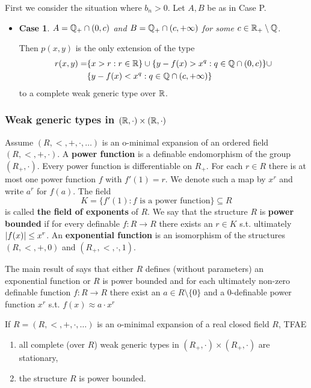 \documentclass[11pt]{article}
\begin{document}
\begin{itemize}
First we consider the situation where \(b_n>0\). Let \(A,B\) be as in Case P.
\begin{itemize}
\item \textbf{Case 1}. \emph{\(A=\mathbb{Q}_+\cap(0,c)\) and \(B=\mathbb{Q}_+\cap(c,+\infty)\) for some \(c\in\mathbb{R}_+\setminus\mathbb{Q}\).}

Then \(p(x,y)\) is the only extension of the type
\begin{align*}
r(x,y)=&\{x>r:r\in\mathbb{R}\}\cup\{y-f(x)>x^q:q\in\mathbb{Q}\cap(0,c)\}\cup\\
&\{y-f(x)<x^q:q\in\mathbb{Q}\cap(c,+\infty)\}
\end{align*}
to a complete weak generic type over \(\mathbb{R}\).
\end{itemize}
\end{itemize}

\subsubsection{Weak generic types in \texorpdfstring{\((\mathbb{R},\cdot)\times(\mathbb{R},\cdot)\)}{R^2}}
\label{sec:orga31ba1e}
Assume \((R,<,+,\cdot,\dots)\) is an o-minimal expansion of an ordered field \((R,<,+,\cdot)\). A \textbf{power
function} is a definable endomorphism of the group \((R_+,\cdot)\). Every power function is
differentiable on \(R_+\). For each \(r\in R\) there is at most one power function \(f\)
with \(f'(1)=r\). We denote such a map by \(x^r\) and write \(a^r\) for \(f(a)\). The field
\begin{equation*}
K=\{f'(1):f\text{ is a power function}\}\subseteq R
\end{equation*}
is called \textbf{the field of exponents} of \(R\). We say that the structure \(R\) is \textbf{power bounded} if
for every definable \(f:R\to R\) there exists an \(r\in K\) s.t. ultimately \(\abs{f(x)}\le x^r\). An
\textbf{exponential function} is an isomorphism of the structures \((R,<,+,0)\) and \((R_+,<,\cdot,1)\).

The main result of \cite{miller1996growth} says that either \(R\) defines (without parameters)
an exponential function or \(R\) is power bounded and for each ultimately non-zero definable
function \(f:R\to R\) there exist an \(a\in R\setminus\{0\}\) and a 0-definable power function \(x^r\)
s.t. \(f(x)\approx a\cdot x^r\)

\begin{theorem}[]
\label{3.5.9}
If \(R=(R,<,+,\cdot,\dots)\)  is an o-minimal expansion of a real closed field \(R\), TFAE
\begin{enumerate}
\item all complete (over \(R\)) weak generic types in \((R_+,\cdot)\times(R_+,\cdot)\) are stationary,
\item the structure \(R\) is power bounded.
\end{enumerate}
\end{theorem}
\end{document}
